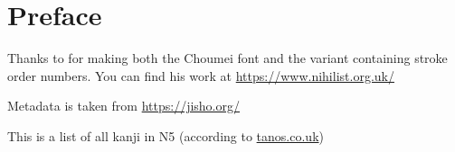 \documentclass{article}
\begin{document}


\break

\tableofcontents
\break

\section*{Preface}


Thanks to for making both the Choumei font and the variant containing stroke order numbers. You can find his work at \url{https://www.nihilist.org.uk/}

Metadata is taken from \url{https://jisho.org/}

This is a list of all kanji in N5 (according to \href{http://www.tanos.co.uk/jlpt/skills/kanji/}{tanos.co.uk})

\break





% 


% 


% 


% 
\end{document}
